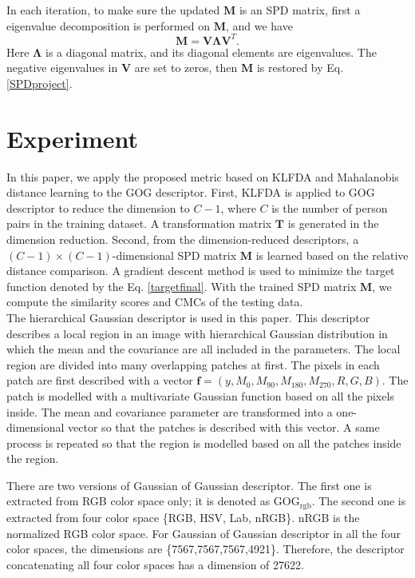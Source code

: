 \documentclass[10pt,twocolumn,letterpaper]{article}
\begin{document}
In each iteration, to make sure the updated $\bm{M}$ is an SPD matrix, first a eigenvalue decomposition is performed on $\bm{M}$, and we have
\begin{equation}\label{SPDproject}
\bm{M} = \bm{V}\bm{\Lambda}\bm{V}^T.
\end{equation}
Here $\bm{\Lambda}$ is a diagonal matrix, and its diagonal elements are eigenvalues. The negative eigenvalues in $\bm{V}$ are set to zeros, then $\bm{M}$ is restored by Eq. \eqref{SPDproject}.
 

\section{Experiment}
In this paper, we apply the proposed metric based on KLFDA and Mahalanobis distance learning to the GOG descriptor. First, KLFDA is applied to GOG descriptor to reduce the dimension to $C-1$, where $C$ is the number of person pairs in the training dataset. A transformation matrix $\bm{T}$ is generated in the dimension reduction. Second, from the dimension-reduced descriptors, a $(C-1) \times (C-1)$-dimensional SPD matrix $\bm{M}$ is learned based on the relative distance comparison. A gradient descent method is used to minimize the target function denoted by the Eq. \eqref{targetfinal}. With the trained SPD matrix $\bm{M}$, we compute the similarity scores and CMCs of the testing data.\\
\indent The hierarchical Gaussian descriptor \cite{GOG} is used in this paper. This descriptor describes a local region in an image with hierarchical Gaussian distribution in which the mean and the covariance are all included in the parameters. The local region are divided into many overlapping patches at first. The pixels in each patch are first described with a vector $\bm{f} = (y, M_0,M_{90},M_{180},M_{270}, R, G, B)$. The patch is modelled with a multivariate Gaussian function based on all the pixels inside. The mean and covariance parameter are transformed into a one-dimensional vector so that the patches is described with this vector. A same process is repeated so that the region is modelled based on all the patches inside the region.

There are two versions of Gaussian of Gaussian descriptor. The first one is extracted from RGB color space only; it is denoted as GOG$_\text{rgb}$. The second one is extracted from four color space \{RGB, HSV, Lab, nRGB\}. nRGB is the normalized RGB color space. For Gaussian of Gaussian descriptor in all the four color spaces, the dimensions are \{7567,7567,7567,4921\}. Therefore, the descriptor concatenating all four color spaces has a dimension of 27622.
\end{document}
